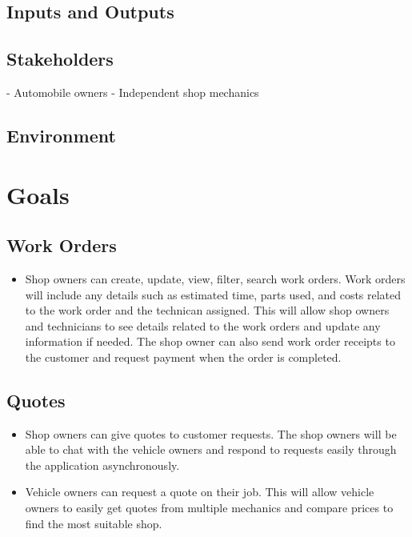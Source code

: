 \documentclass{article}
\begin{document}
\subsection{Inputs and Outputs}


\subsection{Stakeholders}
- Automobile owners
- Independent shop mechanics

\subsection{Environment}


\section{Goals}
\subsection{Work Orders}
\begin{itemize}
\item Shop owners can create, update, view, filter, search work orders. Work orders will include any details such as estimated time, parts used, and costs related to the work order and the technican assigned. This will allow shop owners and technicians to see details related to the work orders and update any information if needed. The shop owner can also send work order receipts to the customer and request payment when the order is completed.
\end{itemize}

\subsection{Quotes}
\begin{itemize}
\item Shop owners can give quotes to customer requests. The shop owners will be able to chat with the vehicle owners and respond to requests easily through the application asynchronously.
\item Vehicle owners can request a quote on their job. This will allow vehicle owners to easily get quotes from multiple mechanics and compare prices to find the most suitable shop.
\end{itemize}
\end{document}

